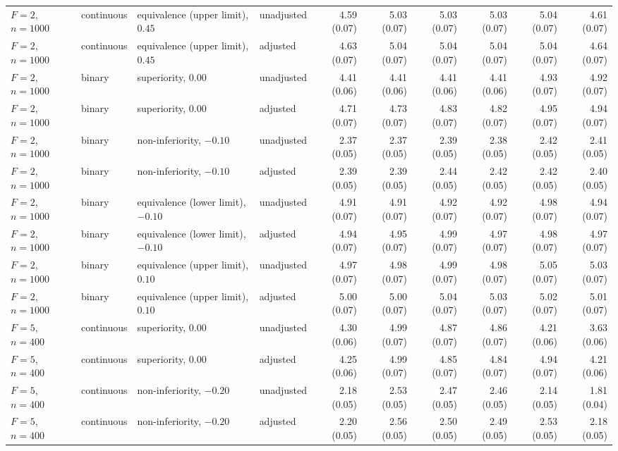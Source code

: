 \documentclass[12pt,a4paper]{article}
\theoremstyle{definition}
\theoremstyle{remark}\newtheorem{remark}{Remark}
\numberwithin{equation}{section}
\begin{document}
\begin{landscape}
\begin{singlespace}
\begin{longtable}{@{}llllrrrrrr@{}}
$F=2$, $n=1000$ & continuous & equivalence (upper limit), $0.45$ & unadjusted & 4.59 (0.07) & 5.03 (0.07) & 5.03 (0.07) & 5.03 (0.07) & 5.04 (0.07) & 4.61 (0.07)\\
$F=2$, $n=1000$ & continuous & equivalence (upper limit), $0.45$ & adjusted & 4.63 (0.07) & 5.04 (0.07) & 5.04 (0.07) & 5.04 (0.07) & 5.04 (0.07) & 4.64 (0.07)\\
$F=2$, $n=1000$ & binary & superiority, $0.00$ & unadjusted & 4.41 (0.06) & 4.41 (0.06) & 4.41 (0.06) & 4.41 (0.06) & 4.93 (0.07) & 4.92 (0.07)\\
$F=2$, $n=1000$ & binary & superiority, $0.00$ & adjusted & 4.71 (0.07) & 4.73 (0.07) & 4.83 (0.07) & 4.82 (0.07) & 4.95 (0.07) & 4.94 (0.07)\\
$F=2$, $n=1000$ & binary & non-inferiority, $-0.10$ & unadjusted & 2.37 (0.05) & 2.37 (0.05) & 2.39 (0.05) & 2.38 (0.05) & 2.42 (0.05) & 2.41 (0.05)\\
$F=2$, $n=1000$ & binary & non-inferiority, $-0.10$ & adjusted & 2.39 (0.05) & 2.39 (0.05) & 2.44 (0.05) & 2.42 (0.05) & 2.42 (0.05) & 2.40 (0.05)\\
$F=2$, $n=1000$ & binary & equivalence (lower limit), $-0.10$ & unadjusted & 4.91 (0.07) & 4.91 (0.07) & 4.92 (0.07) & 4.92 (0.07) & 4.98 (0.07) & 4.94 (0.07)\\
$F=2$, $n=1000$ & binary & equivalence (lower limit), $-0.10$ & adjusted & 4.94 (0.07) & 4.95 (0.07) & 4.99 (0.07) & 4.97 (0.07) & 4.98 (0.07) & 4.97 (0.07)\\
$F=2$, $n=1000$ & binary & equivalence (upper limit), $0.10$ & unadjusted & 4.97 (0.07) & 4.98 (0.07) & 4.99 (0.07) & 4.98 (0.07) & 5.05 (0.07) & 5.03 (0.07)\\
$F=2$, $n=1000$ & binary & equivalence (upper limit), $0.10$ & adjusted & 5.00 (0.07) & 5.00 (0.07) & 5.04 (0.07) & 5.03 (0.07) & 5.02 (0.07) & 5.01 (0.07)\\
$F=5$, $n=400$ & continuous & superiority, $0.00$ & unadjusted & 4.30 (0.06) & 4.99 (0.07) & 4.87 (0.07) & 4.86 (0.07) & 4.21 (0.06) & 3.63 (0.06)\\
$F=5$, $n=400$ & continuous & superiority, $0.00$ & adjusted & 4.25 (0.06) & 4.99 (0.07) & 4.85 (0.07) & 4.84 (0.07) & 4.94 (0.07) & 4.21 (0.06)\\
$F=5$, $n=400$ & continuous & non-inferiority, $-0.20$ & unadjusted & 2.18 (0.05) & 2.53 (0.05) & 2.47 (0.05) & 2.46 (0.05) & 2.14 (0.05) & 1.81 (0.04)\\
$F=5$, $n=400$ & continuous & non-inferiority, $-0.20$ & adjusted & 2.20 (0.05) & 2.56 (0.05) & 2.50 (0.05) & 2.49 (0.05) & 2.53 (0.05) & 2.18 (0.05)\\

\end{longtable}
\end{singlespace}
\end{landscape}
\end{document}
